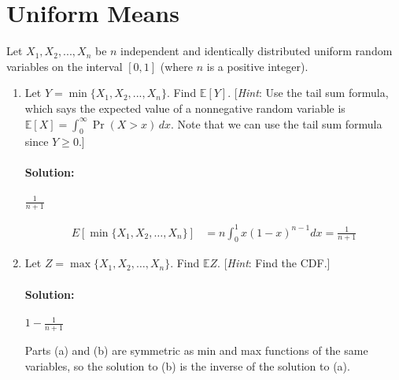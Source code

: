 \documentclass[11pt, notitlepage]{article}
\newcommand{\E}{\mathbb{E}}
\newcommand{\Question}[1]{\newpage\section{#1}}
\newenvironment{solution}{\paragraph{Solution:}}{\hfill \vspace{10mm}}
\begin{document}
\Question{Uniform Means}

Let $X_1, X_2, ..., X_n$ be $n$ independent and identically distributed uniform random variables on the interval $[0, 1]$ (where $n$ is a positive integer).

\begin{enumerate}[label=\alph*.)]
    \item Let $Y = \min\{X_1, X_2, ..., X_n\}$. Find $\E[Y]$. [\textit{Hint}: Use the tail sum formula, which says the expected value of a nonnegative random variable is $\E[X] = \int_{0}^{\infty} \Pr(X > x) \,  dx$. Note that we can use the tail sum formula since $Y \geq 0$.]
    \begin{solution} $\frac{1}{n+1}$
    
        	$$\begin{aligned}
        		E[\min\{X_1, X_2, \dotsc, X_n\}]&=n\int_{0}^{1}x(1-x)^{n-1}dx=\frac{1}{n+1}
        	\end{aligned}$$
    \end{solution} 
	\item Let $Z = \max\{X_1, X_2, \dotsc, X_n\}$. Find $\E{Z}$.
        [\textit{Hint}: Find the CDF.]
        \begin{solution}$1-\frac{1}{n+1}$
        	
        	Parts (a) and (b) are symmetric as min and max functions of the same variables, so the solution to (b) is the inverse of the solution to (a).
        	
        \end{solution}
\end{enumerate}
\end{document}

